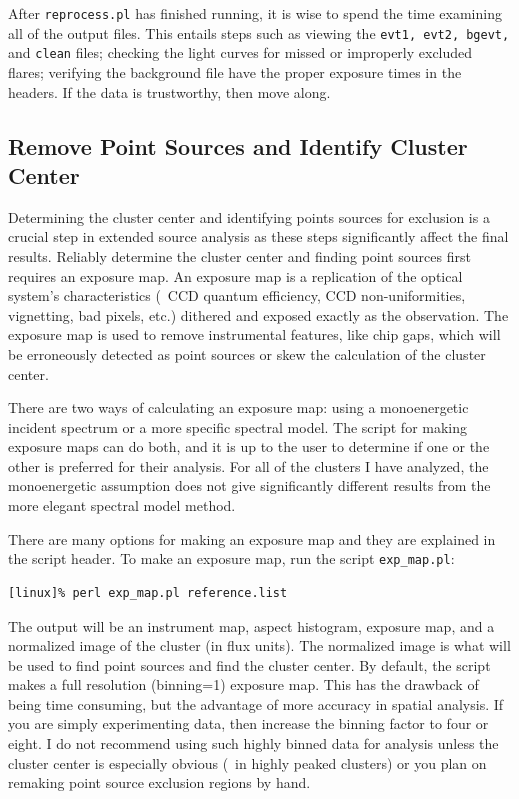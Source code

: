 After {\tt{reprocess.pl}} has finished running, it is wise to spend
the time examining all of the output files. This entails steps such as
viewing the {\tt{evt1, evt2, bgevt,}} and {\tt{clean}} files; checking
the light curves for missed or improperly excluded flares; verifying
the background file have the proper exposure times in the headers. If
the data is trustworthy, then move along.

\subsection{Remove Point Sources and Identify Cluster Center}

Determining the cluster center and identifying points sources for
exclusion is a crucial step in extended source analysis as these steps
significantly affect the final results. Reliably determine the cluster
center and finding point sources first requires an exposure map. An
exposure map is a replication of the optical system's characteristics
(\eg\ CCD quantum efficiency, CCD non-uniformities, vignetting, bad
pixels, etc.) dithered and exposed exactly as the observation. The
exposure map is used to remove instrumental features, like chip gaps,
which will be erroneously detected as point sources or skew the
calculation of the cluster center.

There are two ways of calculating an exposure map: using a
monoenergetic incident spectrum or a more specific spectral model. The
script for making exposure maps can do both, and it is up to the user
to determine if one or the other is preferred for their analysis. For
all of the clusters I have analyzed, the monoenergetic assumption does
not give significantly different results from the more elegant
spectral model method.

There are many options for making an exposure map and they are
explained in the script header. To make an exposure map, run the
script {\tt{exp\_map.pl}}:
\begin{verbatim}
[linux]% perl exp_map.pl reference.list
\end{verbatim}
The output will be an instrument map, aspect histogram, exposure map,
and a normalized image of the cluster (in flux units). The normalized
image is what will be used to find point sources and find the cluster
center. By default, the script makes a full resolution (binning=1)
exposure map. This has the drawback of being time consuming, but the
advantage of more accuracy in spatial analysis. If you are simply
experimenting data, then increase the binning factor to four or
eight. I do not recommend using such highly binned data for analysis
unless the cluster center is especially obvious (\ie\ in highly peaked
clusters) or you plan on remaking point source exclusion regions by
hand.

